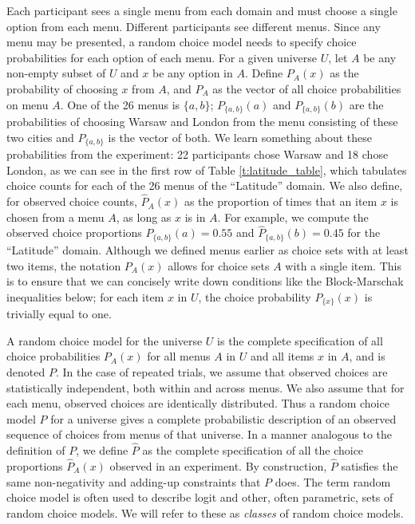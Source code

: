 \documentclass[11pt,letter]{article}
\newcommand{\menu}{menu}
\newcommand{\menus}{menus}
\newcommand{\univ}{U}
\begin{document}
Each participant sees a single \menu{} from each domain and must choose a single option from each \menu{}.
Different participants see different \menus{}.
Since any \menu{} may be presented, a random choice model needs to specify choice probabilities for each option of each \menu{}.
For a given universe $\univ$, let $A$ be any non-empty subset of $\univ$ and $x$ be any option in $A$.
Define $P_A(x)$ as the probability of choosing $x$ from $A$, and $P_A$ as the vector of all choice probabilities on \menu{} $A$.
One of the 26 \menus{} is $\{a,b\}$; $P_{\{a,b\}}(a)$ and $P_{\{a,b\}}(b)$ are the probabilities of choosing Warsaw and London from the \menu{} consisting of these two cities and $P_{\{a,b\}}$ is the vector of both.
We learn something about these probabilities from the experiment: 22 participants chose Warsaw and 18 chose London, as we can see in the first row of Table \ref{t:latitude_table}, which tabulates choice counts for each of the 26 \menus{} of the ``Latitude'' domain.
We also define, for observed choice counts, $\hat P_A(x)$ as the proportion of times that an item $x$ is chosen from a \menu{} $A$, as long as $x$ is in $A$.
For example, we compute the observed choice proportions $\hat P_{\{a,b\}}(a) = 0.55$ and $\hat P_{\{a,b\}}(b) = 0.45$ for the ``Latitude'' domain.
Although we defined \menus{} earlier as choice sets with at least two items, the notation $P_A(x)$ allows for choice sets $A$ with a single item.
This is to ensure that we can concisely write down conditions like the Block-Marschak inequalities below; for each item $x$ in $\univ$, the choice probability $P_{\{x\}}(x)$ is trivially equal to one.

A random choice model for the universe $\univ$ is the complete specification of all choice probabilities $P_A(x)$ for all \menus{} $A$ in $U$ and all items $x$ in $A$, and is denoted $P$.
In the case of repeated trials, we assume that observed choices are statistically independent, both within and across menus.
We also assume that for each menu, observed choices are identically distributed.
Thus a random choice model $P$ for a universe gives a complete probabilistic description of an observed sequence of choices from menus of that universe.
In a manner analogous to the definition of $P$, we define $\hat P$ as the complete specification of all the choice proportions $\hat{P}_A(x)$ observed in an experiment.
By construction, $\hat P$ satisfies the same non-negativity and adding-up constraints that $P$ does.
The term random choice model is often used to describe logit and other, often parametric, sets of random choice models.
We will refer to these as {\em classes} of random choice models.
\end{document}

